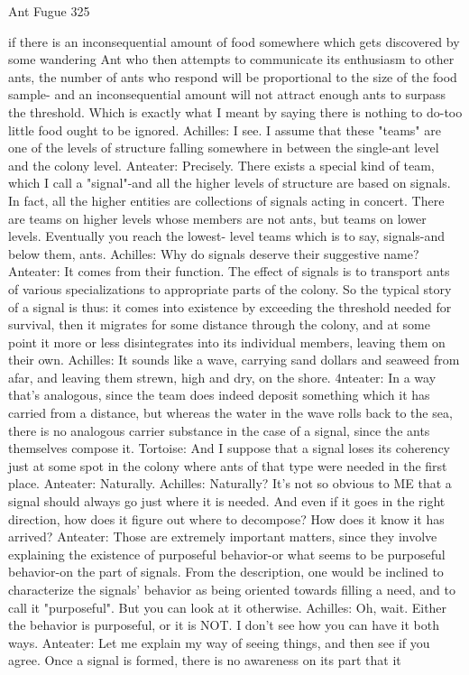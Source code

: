 Ant Fugue                                                                                325

    if there is an inconsequential amount of food somewhere which gets discovered by
    some wandering Ant who then attempts to communicate its enthusiasm to other ants,
    the number of ants who respond will be proportional to the size of the food sample-
    and an inconsequential amount will not attract enough ants to surpass the threshold.
    Which is exactly what I meant by saying there is nothing to do-too little food ought
    to be ignored.
Achilles: I see. I assume that these "teams" are one of the levels of structure falling
    somewhere in between the single-ant level and the colony level.
Anteater: Precisely. There exists a special kind of team, which I call a "signal"-and all the
    higher levels of structure are based on signals. In fact, all the higher entities are
    collections of signals acting in concert. There are teams on higher levels whose
    members are not ants, but teams on lower levels. Eventually you reach the lowest-
    level teams which is to say, signals-and below them, ants.
Achilles: Why do signals deserve their suggestive name?
Anteater: It comes from their function. The effect of signals is to transport ants of various
    specializations to appropriate parts of the colony. So the typical story of a signal is
    thus: it comes into existence by exceeding the threshold needed for survival, then it
    migrates for some distance through the colony, and at some point it more or less
    disintegrates into its individual members, leaving them on their own.
Achilles: It sounds like a wave, carrying sand dollars and seaweed from afar, and leaving
    them strewn, high and dry, on the shore.
4nteater: In a way that's analogous, since the team does indeed deposit something which
    it has carried from a distance, but whereas the water in the wave rolls back to the sea,
    there is no analogous carrier substance in the case of a signal, since the ants
    themselves compose it.
Tortoise: And I suppose that a signal loses its coherency just at some spot in the colony
    where ants of that type were needed in the first place.
Anteater: Naturally.
Achilles: Naturally? It's not so obvious to ME that a signal should always go just where it
    is needed. And even if it goes in the right direction, how does it figure out where to
    decompose? How does it know it has arrived?
Anteater: Those are extremely important matters, since they involve explaining the
    existence of purposeful behavior-or what seems to be purposeful behavior-on the part
    of signals. From the description, one would be inclined to characterize the signals'
    behavior as being oriented towards filling a need, and to call it "purposeful". But you
    can look at it otherwise.
Achilles: Oh, wait. Either the behavior is purposeful, or it is NOT. I don't see how you
    can have it both ways.
Anteater: Let me explain my way of seeing things, and then see if you agree. Once a
    signal is formed, there is no awareness on its part that it




